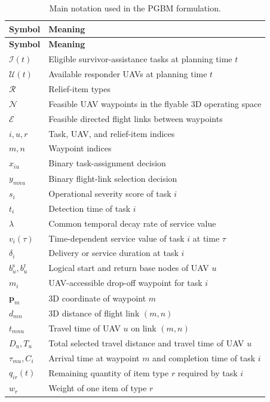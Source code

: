 \begin{longtable}{p{}p{}}
\caption{Main notation used in the PGBM formulation.}
\label{tab:main_notation}\\
\hline
\textbf{Symbol} & \textbf{Meaning}\\
\hline
\endfirsthead
\hline
\textbf{Symbol} & \textbf{Meaning}\\
\hline
\endhead
$\mathcal{I}(t)$ & Eligible survivor-assistance tasks at planning time $t$\\
$\mathcal{U}(t)$ & Available responder UAVs at planning time $t$\\
$\mathcal{R}$ & Relief-item types\\
$\mathcal{N}$ & Feasible UAV waypoints in the flyable 3D operating space\\
$\mathcal{E}$ & Feasible directed flight links between waypoints\\
$i,u,r$ & Task, UAV, and relief-item indices\\
$m,n$ & Waypoint indices\\
$x_{iu}$ & Binary task-assignment decision\\
$y_{mnu}$ & Binary flight-link selection decision\\
$s_i$ & Operational severity score of task $i$\\
$t_i$ & Detection time of task $i$\\
$\lambda$ & Common temporal decay rate of service value\\
$v_i(\tau)$ & Time-dependent service value of task $i$ at time $\tau$\\
$\delta_i$ & Delivery or service duration at task $i$\\
$b_u^{\mathrm{s}}, b_u^{\mathrm{r}}$ & Logical start and return base nodes of UAV $u$\\
$m_i$ & UAV-accessible drop-off waypoint for task $i$\\
$\mathbf{p}_m$ & 3D coordinate of waypoint $m$\\
$d_{mn}$ & 3D distance of flight link $(m,n)$\\
$t_{mnu}$ & Travel time of UAV $u$ on link $(m,n)$\\
$D_u,T_u$ & Total selected travel distance and travel time of UAV $u$\\
$\tau_{mu},C_i$ & Arrival time at waypoint $m$ and completion time of task $i$\\
$q_{ir}(t)$ & Remaining quantity of item type $r$ required by task $i$\\
$w_r$ & Weight of one item of type $r$\\

\end{longtable}
